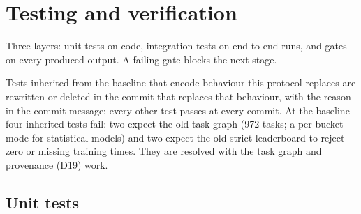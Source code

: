 \documentclass[11pt,a4paper]{article}
\begin{document}
\section{Testing and verification}\label{sec:testing}

Three layers: unit tests on code, integration tests on end-to-end runs, and gates on every
produced output. A failing gate blocks the next stage.

Tests inherited from the baseline that encode behaviour this protocol replaces are rewritten or
deleted in the commit that replaces that behaviour, with the reason in the commit message; every
other test passes at every commit. At the baseline four inherited tests fail: two expect the old
task graph (972 tasks; a per-bucket mode for statistical models) and two expect the old strict
leaderboard to reject zero or missing training times. They are resolved with the task graph and
provenance (D19) work.

\subsection{Unit tests}
\end{document}
